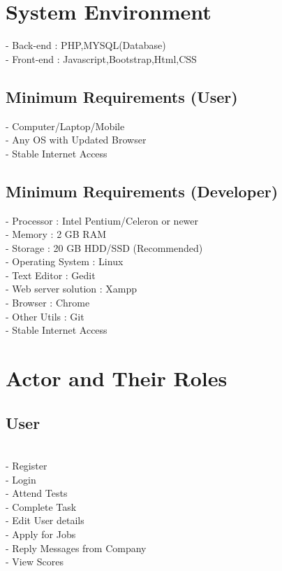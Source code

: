 \documentclass[a4paper,12pt]{report}
\begin{document}
\pagebreak

\section{System Environment}
\hspace*{12pt}
\subitem - Back-end : PHP,MYSQL(Database)\\
\subitem - Front-end : Javascript,Bootstrap,Html,CSS\\

\subsection{Minimum Requirements (User)}
\hspace*{12pt}
\subitem - Computer/Laptop/Mobile \\
\subitem - Any OS with Updated Browser \\
\subitem  - Stable Internet Access \\

\subsection{Minimum Requirements (Developer)}
\hspace*{12pt}
\subitem - Processor : Intel Pentium/Celeron or newer \\
\subitem - Memory : 2 GB RAM \\
\subitem - Storage : 20 GB HDD/SSD (Recommended) \\
\subitem - Operating System : Linux\\
\subitem - Text Editor : Gedit\\
\subitem - Web server solution : Xampp\\
\subitem - Browser : Chrome \\
\subitem - Other Utils : Git \\
\subitem - Stable Internet Access\\

\pagebreak

\section{Actor and Their Roles}
\subsection{User}

\subitem
\\ - Register
\\ - Login
\\ - Attend Tests
\\ - Complete Task
\\ - Edit User details
\\ - Apply for Jobs
\\ - Reply Messages from Company
\\ - View Scores
\end{document}
